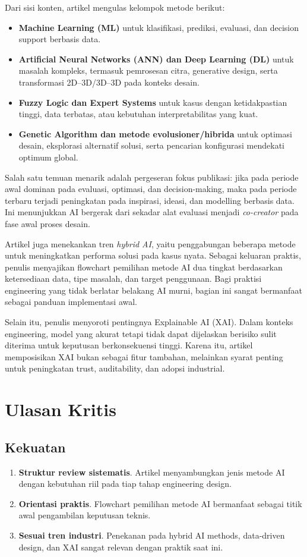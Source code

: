 \documentclass{article}
\begin{document}
Dari sisi konten, artikel mengulas kelompok metode berikut:
\begin{itemize}
    \item \textbf{Machine Learning (ML)} untuk klasifikasi, prediksi, evaluasi, dan decision support berbasis data.
    \item \textbf{Artificial Neural Networks (ANN) dan Deep Learning (DL)} untuk masalah kompleks, termasuk pemrosesan citra, generative design, serta transformasi 2D--3D/3D--3D pada konteks desain.
    \item \textbf{Fuzzy Logic dan Expert Systems} untuk kasus dengan ketidakpastian tinggi, data terbatas, atau kebutuhan interpretabilitas yang kuat.
    \item \textbf{Genetic Algorithm dan metode evolusioner/hibrida} untuk optimasi desain, eksplorasi alternatif solusi, serta pencarian konfigurasi mendekati optimum global.
\end{itemize}

Salah satu temuan menarik adalah pergeseran fokus publikasi: jika pada periode awal dominan pada evaluasi, optimasi, dan decision-making, maka pada periode terbaru terjadi peningkatan pada inspirasi, ideasi, dan modelling berbasis data. Ini menunjukkan AI bergerak dari sekadar alat evaluasi menjadi \textit{co-creator} pada fase awal proses desain.

Artikel juga menekankan tren \textit{hybrid AI}, yaitu penggabungan beberapa metode untuk meningkatkan performa solusi pada kasus nyata. Sebagai keluaran praktis, penulis menyajikan flowchart pemilihan metode AI dua tingkat berdasarkan ketersediaan data, tipe masalah, dan target penggunaan. Bagi praktisi engineering yang tidak berlatar belakang AI murni, bagian ini sangat bermanfaat sebagai panduan implementasi awal.

Selain itu, penulis menyoroti pentingnya Explainable AI (XAI). Dalam konteks engineering, model yang akurat tetapi tidak dapat dijelaskan berisiko sulit diterima untuk keputusan berkonsekuensi tinggi. Karena itu, artikel memposisikan XAI bukan sebagai fitur tambahan, melainkan syarat penting untuk peningkatan trust, auditability, dan adopsi industrial.

\section*{Ulasan Kritis}
\subsection*{Kekuatan}
\begin{enumerate}
    \item \textbf{Struktur review sistematis}. Artikel menyambungkan jenis metode AI dengan kebutuhan riil pada tiap tahap engineering design.
    \item \textbf{Orientasi praktis}. Flowchart pemilihan metode AI bermanfaat sebagai titik awal pengambilan keputusan teknis.
    \item \textbf{Sesuai tren industri}. Penekanan pada hybrid AI methods, data-driven design, dan XAI sangat relevan dengan praktik saat ini.
\end{enumerate}
\end{document}
